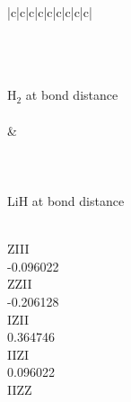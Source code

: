 \documentclass[twocolumn]{revtex4-1}
\newcommand{\1}{\mathbbm{1}}
\begin{document}
\cleardoublepage

\begin{longtable}{|c|c|c|c|c|c|c|c|c|}
\caption{\label{HamTable}The H$_2$, LiH and BeH$_2$ Hamiltonians at the bond distance. Listed are all the Pauli operators, grouped in the different TPB sets, with the corresponding coefficients, not taking into account for the energy shifts due to the filling of inner orbitals and the Coulomb repulsion between nuclei. X,Y,Z,I here stand for the Pauli matrices $\sigma^x$, $\sigma^y$, $\sigma^z$ and the identity operator on a single qubit subspace, respectively. There are 2,25,44 TPB sets for H$_2$, LiH and BeH$_2$, respectively with 4, 99 and 164 Pauli terms in total.  }
\\
 \\[2ex]\\
 {\large H$_2$ at bond distance}\\[2ex]\\
\hline
{}
&
\\
\hline\\
 \\[2ex]\\
 {\large LiH at bond distance}\\[2ex]\\  %
\hline
\parbox{1.9cm}{\centering\vspace{.5\baselineskip}
ZIII\\
-0.096022\\ 
ZZII\\
-0.206128\\ 
IZII\\
0.364746\\ 
IIZI\\
0.096022\\ 
IIZZ\\
}
\end{longtable}
\end{document}

